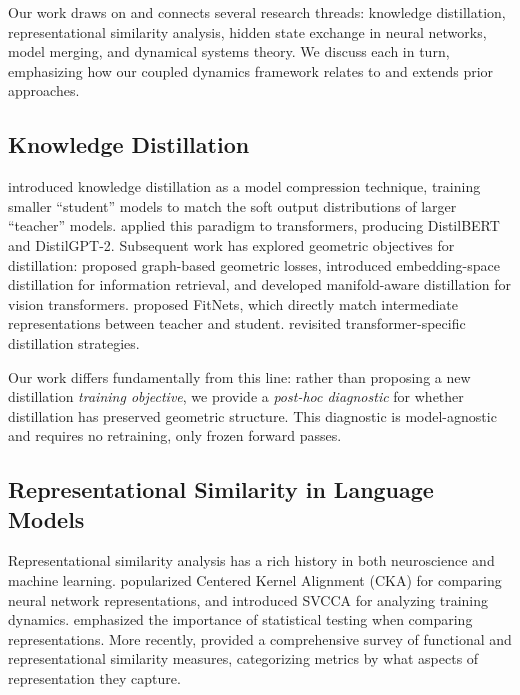 \documentclass[10pt]{article} %
\theoremstyle{plain}
\theoremstyle{definition}
\theoremstyle{remark}
\begin{document}
Our work draws on and connects several research threads: knowledge distillation, representational similarity analysis, hidden state exchange in neural networks, model merging, and dynamical systems theory. We discuss each in turn, emphasizing how our coupled dynamics framework relates to and extends prior approaches.

\subsection{Knowledge Distillation}

\citet{hinton2015distilling} introduced knowledge distillation as a model compression technique, training smaller ``student'' models to match the soft output distributions of larger ``teacher'' models. \citet{sanh2019distilbert} applied this paradigm to transformers, producing DistilBERT and DistilGPT-2. Subsequent work has explored geometric objectives for distillation: \citet{li2019deepgkd} proposed graph-based geometric losses, \citet{liu2023embeddistill} introduced embedding-space distillation for information retrieval, and \citet{yuan2021manifoldkd} developed manifold-aware distillation for vision transformers. \citet{romero2015fitnets} proposed FitNets, which directly match intermediate representations between teacher and student. \citet{jiao2022revisiting} revisited transformer-specific distillation strategies.

Our work differs fundamentally from this line: rather than proposing a new distillation \textit{training objective}, we provide a \textit{post-hoc diagnostic} for whether distillation has preserved geometric structure. This diagnostic is model-agnostic and requires no retraining, only frozen forward passes.

\subsection{Representational Similarity in Language Models}

Representational similarity analysis has a rich history in both neuroscience and machine learning. \citet{kornblith2019similarity} popularized Centered Kernel Alignment (CKA) for comparing neural network representations, and \citet{raghu2017svcca} introduced SVCCA for analyzing training dynamics. \citet{ding2021grounding} emphasized the importance of statistical testing when comparing representations. More recently, \citet{klabunde2023similarity} provided a comprehensive survey of functional and representational similarity measures, categorizing metrics by what aspects of representation they capture.
\end{document}
